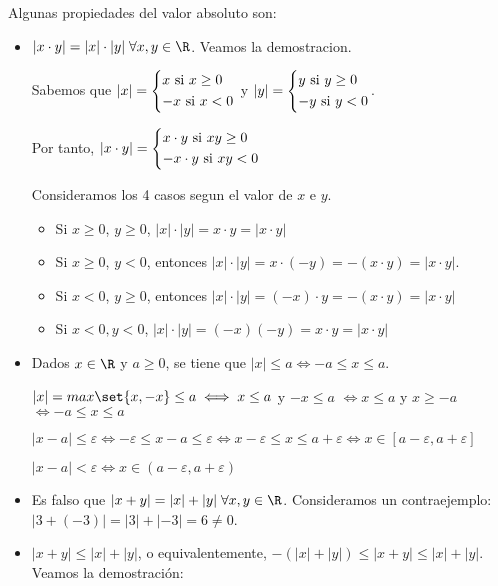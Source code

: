 Algunas propiedades del valor absoluto son:
\begin{itemize}
	\item \(|x \cdot y | = |x| \cdot |y| \; \forall x,y \in \R \). Veamos la demostracion.
	      
	      Sabemos que \(|x| = \begin{dcases}
		      x \text{ si } x \geq 0 \\
		      - x \text{ si } x < 0
	      \end{dcases}\) y \(|y| = \begin{dcases}
		      y \text{ si } y \geq 0 \\
		      - y \text{ si } y < 0
	      \end{dcases}\).
	      
	      Por tanto, \(|x \cdot y| = \begin{dcases}
		      x \cdot y \text{ si } xy \geq 0 \\
		      -x \cdot y \text{ si } xy < 0
	      \end{dcases}\)
	      
	      Consideramos los 4 casos segun el valor de \(x \) e \(y \).
	      
	      \begin{itemize}
		      \item Si \(x \geq 0\), \(y \geq 0 \), \(|x| \cdot |y| = x \cdot y = |x \cdot y| \)
		      \item Si \(x \geq 0 \), \(y < 0 \), entonces \(|x| \cdot |y| = x \cdot (-y) = -(x\cdot y) = |x \cdot y|\).
		      \item Si \(x < 0\), \(y \geq 0 \), entonces \(|x| \cdot |y| = (-x) \cdot y = -(x \cdot y) = |x \cdot y|\)
		      \item Si \(x < 0, y < 0 \), \(|x| \cdot |y| = (-x) (-y) = x \cdot y = |x \cdot y | \)
	      \end{itemize}
	\item Dados \(x \in \R \) y \(a \geq  0 \), se tiene que \(|x| \leq a \iff -a \leq x \leq a \).
	      
	      \(|x| = max\set{x,-x} \leq a \iff  x \leq a \) y \(-x \leq a \) \(\iff  x \leq a \) y \(x \geq -a \) \(\iff -a \leq x \leq a \)
	      
	      \begin{example}
		      \(|x - a| \leq \varepsilon \iff - \varepsilon \leq x - a \leq \varepsilon \iff x - \varepsilon \leq x \leq a + \varepsilon \iff x \in [a - \varepsilon, a + \varepsilon]\)
		      
		      \(|x - a | < \varepsilon \iff x \in (a - \varepsilon, a  + \varepsilon)\)
	      \end{example}
	\item Es falso que \(|x + y | = |x | + |y| \; \forall x,y \in \R \). Consideramos un contraejemplo: \(|3 + (-3) | = |3| + |-3| = 6 \neq 0\).
	\item \(|x + y| \leq |x | + |y| \), o equivalentemente, \(-(|x| + |y|) \leq |x + y| \leq |x| + |y| \). Veamos la demostración:
	      

\end{itemize}
